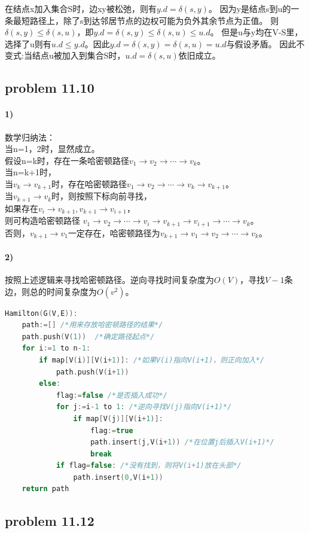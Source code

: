 \documentclass[11pt,a4paper,oneside,oldfontcommands]{ctexart}
\begin{document}
在结点x加入集合S时，边xy被松弛，则有$y.d=\delta(s,y)$。
因为y是结点s到u的一条最短路径上，除了s到达邻居节点的边权可能为负外其余节点为正值。
则$\delta(s,y)\leq\delta(s,u)$，即$y.d=\delta(s,y)\leq \delta(s,u)\leq u.d$。
但是u与y均在V-S里，选择了u则有$u.d\leq y.d$。因此$y.d=\delta(s,y)=\delta(s,u)=u.d$与假设矛盾。
因此不变式:当结点u被加入到集合S时，$u.d=\delta(s,u)$依旧成立。
{\subsection*{problem 11.10}}
\paragraph*{1)}数学归纳法：\\
当n=1，2时，显然成立。\\
假设n=k时，存在一条哈密顿路径$v_1\rightarrow v_2\rightarrow \cdots \rightarrow v_k$。\\
当n=k+1时，\\
当$v_k\rightarrow v_{k+1}$时，存在哈密顿路径$v_1\rightarrow v_2\rightarrow \cdots \rightarrow v_k\rightarrow v_{k+1}$。\\
当$v_{k+1}\rightarrow v_{k}$时，则按照下标向前寻找，\\
如果存在$v_i\rightarrow v_{k+1},v_{k+1}\rightarrow v_{i+1}$，
\\则可构造哈密顿路径
$v_1\rightarrow v_2\rightarrow\cdots\rightarrow v_i\rightarrow v_{k+1} \rightarrow v_{i+1}\rightarrow\cdots\rightarrow v_k$。\\
否则，$v_{k+1}\rightarrow v_1$一定存在，哈密顿路径为$v_{k+1}\rightarrow v_1\rightarrow v_2\rightarrow \cdots \rightarrow v_k$。
\paragraph*{2)}按照上述逻辑来寻找哈密顿路径。逆向寻找时间复杂度为$O(V)$，寻找$V-1$条边，则总的时间复杂度为$O(v^2)$。
\begin{lstlisting}[language=C++,title=Hamilton.func]
Hamilton(G(V,E)):
	path:=[] /*用来存放哈密顿路径的结果*/
	path.push(V(1))  /*确定路径起点*/
	for i:=1 to n-1:
		if map[V(i)][V(i+1)]: /*如果V(i)指向V(i+1)，则正向加入*/
			path.push(V(i+1))
		else:
			flag:=false /*是否插入成功*/
			for j:=i-1 to 1: /*逆向寻找V(j)指向V(i+1)*/
				if map[V(j)][V(i+1)]:
					flag:=true
					path.insert(j,V(i+1)) /*在位置j后插入V(i+1)*/
					break
			if flag=false: /*没有找到，则将V(i+1)放在头部*/
				path.insert(0,V(i+1))
	return path
\end{lstlisting}
{\subsection*{problem 11.12}}
\end{document}
